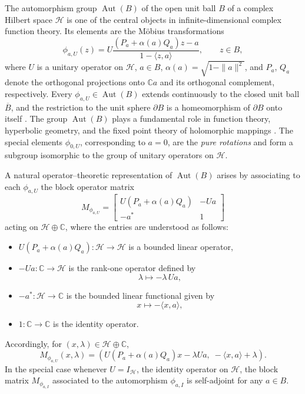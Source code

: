 \documentclass[12pt]{amsart}
\theoremstyle{definition}
\renewcommand{\H}{\mathcal{H}}
\newcommand{\Aut}{\operatorname{Aut}}
\begin{document}
\noindent The automorphism group $\Aut(B)$ of the open unit ball $B$ of a complex
Hilbert space $\mathcal{H}$ is one of the central objects in infinite-dimensional complex function theory. Its elements are the M\"{o}bius transformations
\[
\phi_{a,U}(z) = U\frac{(P_a + \alpha(a)Q_a)z - a}{1 - \langle z, a \rangle},
\qquad z \in B,
\]
where $U$ is a unitary operator on $\mathcal{H}$, $a \in B$, $\alpha(a) = \sqrt{1 - \|a\|^2}$, and $P_a$, $Q_a$ denote the orthogonal projections onto $\mathbb{C}a$ and its orthogonal complement, respectively. Every $\phi_{a,U} \in \Aut(B)$ extends continuously to the closed unit ball $\overline{B}$, and the restriction to the unit sphere $\partial B$ is a homeomorphism of $\partial B$ onto itself \cite{Rudin, FV}.  The group $\Aut(B)$ plays a fundamental role in function theory, hyperbolic geometry, and the fixed point theory of holomorphic mappings \cite{Beardon-Short, Beardon-Wilker, Goebel-Reich}. The special elements $\phi_{0,U}$, corresponding to $a = 0$, are the \emph{pure rotations} and form a subgroup isomorphic to the group of unitary operators on $\H$.

\medskip

\noindent A natural operator--theoretic representation of $\Aut(B)$
arises by associating to each $\phi_{a,U}$ the block operator matrix
\[
M_{\phi_{a,U}} = \begin{bmatrix}
U(P_a + \alpha(a)Q_a) & -Ua \\
-a^* & 1
\end{bmatrix}
\]
acting on $\mathcal{H} \oplus \mathbb{C}$,  where the entries are understood as follows:
\begin{itemize}
\item $U(P_a + \alpha(a)Q_a) : \mathcal H \to \mathcal H$ is a bounded linear operator,
\item $-Ua : \mathbb C \to \mathcal H$ is the rank-one operator defined by
\[
\lambda \mapsto -\lambda\, Ua,
\]
\item $-a^* : \mathcal H \to \mathbb C$ is the bounded linear functional given by
\[
x \mapsto -\langle x, a \rangle,
\]
\item $1 : \mathbb C \to \mathbb C$ is the identity operator.
\end{itemize}
Accordingly, for $(x,\lambda) \in \mathcal H \oplus \mathbb C$,
\[
M_{\phi_{a,U}}(x,\lambda)
=
\left(
U(P_a + \alpha(a)Q_a)x - \lambda Ua,\;
-\langle x,a\rangle + \lambda
\right).
\]
In the special case whenever $U=I_\H$, the identity operator on $\H$, the block matrix $M_{\phi_{a,I}}$ associated to the automorphism $\phi_{a,I}$ is self-adjoint for any $a\in B$.
 
\end{document}
